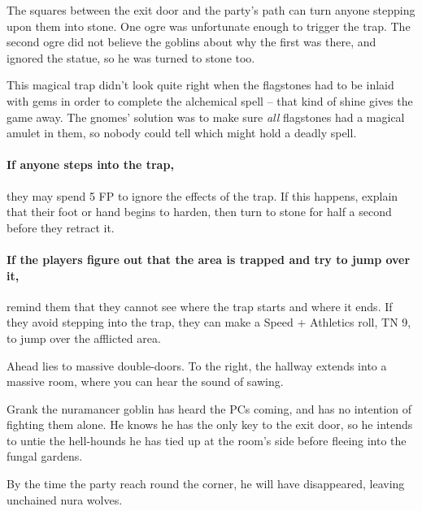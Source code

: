 \begin{multicols}{2}
\begin{boxtext}
\end{boxtext}

The squares between the exit door and the party's path can turn anyone stepping upon them into stone.
One ogre was unfortunate enough to trigger the trap.
The second ogre did not believe the goblins about why the first was there, and ignored the statue, so he was turned to stone too.

This magical trap didn't look quite right when the flagstones had to be inlaid with gems in order to complete the alchemical spell -- that kind of shine gives the game away.
The gnomes' solution was to make sure \textit{all} flagstones had a magical amulet in them, so nobody could tell which might hold a deadly spell.

\paragraph{If anyone steps into the trap,}
they may spend 5 FP to ignore the effects of the trap.
If this happens, explain that their foot or hand begins to harden, then turn to stone for half a second before they retract it.

\paragraph{If the players figure out that the area is trapped and try to jump over it,}
remind them that they cannot see where the trap starts and where it ends.
If they avoid stepping into the trap, they can make a Speed + Athletics roll, TN 9, to jump over the afflicted area.


\begin{boxtext}

	Ahead lies to massive double-doors.
	To the right, the hallway extends into a massive room, where you can hear the sound of sawing.

\end{boxtext}

Grank the nuramancer goblin has heard the PCs coming, and has no intention of fighting them alone.
He knows he has the only key to the exit door, so he intends to untie the hell-hounds he has tied up at the room's side before fleeing into the fungal gardens.

By the time the party reach round the corner, he will have disappeared, leaving unchained nura wolves.



\end{multicols}
